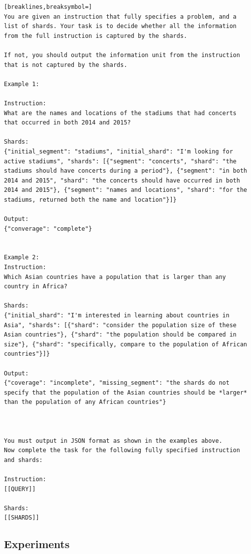 \begin{tcolorbox}[title=Verification]
{\footnotesize
\begin{Verbatim}[breaklines,breaksymbol=]
You are given an instruction that fully specifies a problem, and a list of shards. Your task is to decide whether all the information from the full instruction is captured by the shards.

If not, you should output the information unit from the instruction that is not captured by the shards.

Example 1:

Instruction:
What are the names and locations of the stadiums that had concerts that occurred in both 2014 and 2015?

Shards:
{"initial_segment": "stadiums", "initial_shard": "I'm looking for active stadiums", "shards": [{"segment": "concerts", "shard": "the stadiums should have concerts during a period"}, {"segment": "in both 2014 and 2015", "shard": "the concerts should have occurred in both 2014 and 2015"}, {"segment": "names and locations", "shard": "for the stadiums, returned both the name and location"}]}

Output:
{"converage": "complete"}


Example 2:
Instruction:
Which Asian countries have a population that is larger than any country in Africa?

Shards:
{"initial_shard": "I'm interested in learning about countries in Asia", "shards": [{"shard": "consider the population size of these Asian countries"}, {"shard": "the population should be compared in size"}, {"shard": "specifically, compare to the population of African countries"}]}

Output:
{"coverage": "incomplete", "missing_segment": "the shards do not specify that the population of the Asian countries should be *larger* than the population of any African countries"}



You must output in JSON format as shown in the examples above.
Now complete the task for the following fully specified instruction and shards:

Instruction:
[[QUERY]]

Shards:
[[SHARDS]]
\end{Verbatim}
}
\end{tcolorbox}

\newpage
\subsection{Experiments}\label{experiment_prompt}

